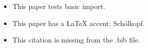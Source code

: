 \documentclass{article}
\begin{document}
\begin{itemize}
  \item \cite{TestImport2026A} This paper tests basic import.
  \item \cite{TestImport2026B} This paper has a LaTeX accent: Sch{\"o}lkopf.
  \item \cite{MissingFromBib2026} This citation is missing from the .bib file.
\end{itemize}
\end{document}
